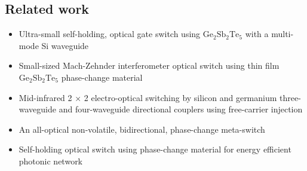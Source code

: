 \documentclass[]{article}
\providecommand{\tightlist}{%
  \setlength{\itemsep}{0pt}\setlength{\parskip}{0pt}}
\begin{document}
\subsection{Related work}\label{related-work}

\begin{itemize}
\tightlist
\item
  Ultra-small self-holding, optical gate switch using
  \(\mathrm{Ge_2 Sb_2 Te_5}\) with a multi-mode Si waveguide
\item
  Small-sized Mach-Zehnder interferometer optical switch using thin film
  \(\mathrm{Ge_2 Sb_2 Te_5}\) phase-change material
\item
  Mid-infrared 2 × 2 electro-optical switching by silicon and germanium
  three-waveguide and four-waveguide directional couplers using
  free-carrier injection
\item
  An all-optical non-volatile, bidirectional, phase-change meta-switch
\item
  Self-holding optical switch using phase-change material for energy
  efficient photonic network
\end{itemize}
\end{document}
